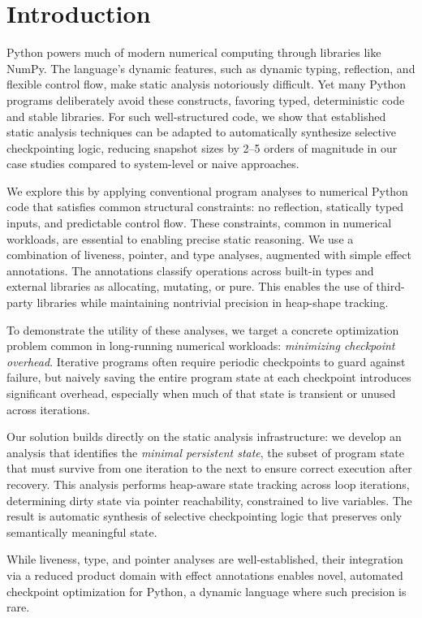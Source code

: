\section{Introduction}
Python powers much of modern numerical computing through libraries like NumPy. The language’s dynamic features, such as dynamic typing, reflection, and flexible control flow, make static analysis notoriously difficult. Yet many Python programs deliberately avoid these constructs, favoring typed, deterministic code and stable libraries. For such well-structured code, we show that established static analysis techniques can be adapted to automatically synthesize selective checkpointing logic, reducing snapshot sizes by 2–5 orders of magnitude in our case studies compared to system-level or naive approaches.

We explore this by applying conventional program analyses to numerical Python code that satisfies common structural constraints: no reflection, statically typed inputs, and predictable control flow. These constraints, common in numerical workloads, are essential to enabling precise static reasoning. We use a combination of liveness, pointer, and type analyses, augmented with simple effect annotations. The annotations classify operations across built-in types and external libraries as allocating, mutating, or pure. This enables the use of third-party libraries while maintaining nontrivial precision in heap-shape tracking.

To demonstrate the utility of these analyses, we target a concrete optimization problem common in long-running numerical workloads: \emph{minimizing checkpoint overhead}. Iterative programs often require periodic checkpoints to guard against failure, but naively saving the entire program state at each checkpoint introduces significant overhead, especially when much of that state is transient or unused across iterations.

Our solution builds directly on the static analysis infrastructure: we develop an analysis that identifies the \emph{minimal persistent state}, the subset of program state that must survive from one iteration to the next to ensure correct execution after recovery. This analysis performs heap-aware state tracking across loop iterations, determining dirty state via pointer reachability, constrained to live variables. The result is automatic synthesis of selective checkpointing logic that preserves only semantically meaningful state.

While liveness, type, and pointer analyses are well-established, their integration via a reduced product domain with effect annotations enables novel, automated checkpoint optimization for Python, a dynamic language where such precision is rare.

